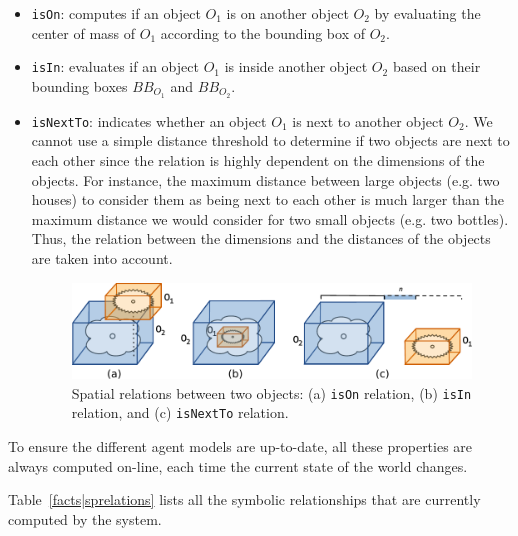\documentclass{svmult}
\newcommand{\concept}[1]{{\footnotesize \texttt{#1}}}
\newcommand{\eg}{e.g.\xspace}
\begin{document}
\begin{itemize}
	\item \concept{isOn}: computes if an object $O_1$ is on another object $O_2$ by
	evaluating the center of mass of $O_1$ according to the bounding box of $O_2$.

	\item \concept{isIn}: evaluates if an object $O_1$ is inside another object
	$O_2$ based on their bounding boxes $BB_{O_1}$ and $BB_{O_2}$.

	\item \concept{isNextTo}: indicates whether an object $O_1$ is next to another
	object $O_2$. We cannot use a simple distance threshold to determine if two
	objects are next to each other since the relation is highly dependent on the
	dimensions of the objects. For instance, the maximum distance between large
	objects (\eg two houses) to consider them as being next to each other is much
	larger than the maximum distance we would consider for two small objects (\eg
	two bottles). Thus, the relation between the dimensions and the distances of
	the objects are taken into account.  

\begin{figure} 
	\centering
	\includegraphics[width=0.95\columnwidth]{figs/spatial_relation.pdf}
	\caption{Spatial relations between two objects: (a) \concept{isOn} relation, 
	(b) \concept{isIn} relation, and (c) \concept{isNextTo} relation.} 
	\label{fig|sprelations} 
\end{figure}

\end{itemize} 

To ensure the different agent models are up-to-date, all these properties are
always computed on-line, each time the current state of the world changes.

Table~\ref{facts|sprelations} lists all the symbolic relationships that are
currently computed by the system.
\end{document}
